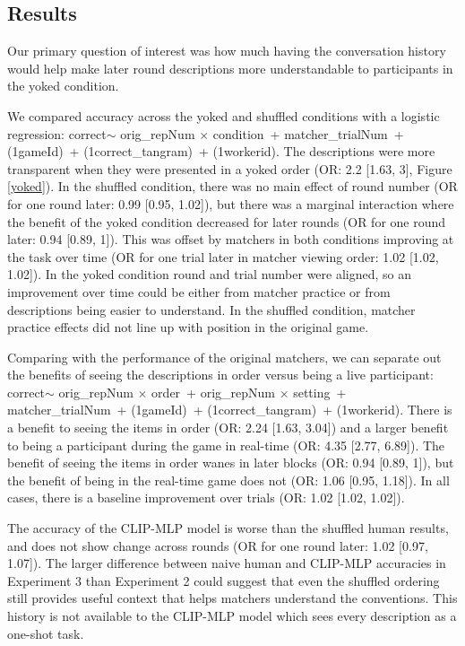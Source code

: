 \documentclass[10pt, letterpaper]{article}
\begin{document}
\subsection{Results}\label{results-2}

Our primary question of interest was how much having the conversation
history would help make later round descriptions more understandable to
participants in the yoked condition.

We compared accuracy across the yoked and shuffled conditions with a
logistic regression: correct\(\sim\) orig\_repNum \(\times\) condition~+
matcher\_trialNum~+ (1\textbar gameId)~+ (1\textbar correct\_tangram)~+
(1\textbar workerid). The descriptions were more transparent when they
were presented in a yoked order (OR: 2.2 {[}1.63, 3{]}, Figure
\ref{yoked}). In the shuffled condition, there was no main effect of
round number (OR for one round later: 0.99 {[}0.95, 1.02{]}), but there
was a marginal interaction where the benefit of the yoked condition
decreased for later rounds (OR for one round later: 0.94 {[}0.89, 1{]}).
This was offset by matchers in both conditions improving at the task
over time (OR for one trial later in matcher viewing order: 1.02
{[}1.02, 1.02{]}). In the yoked condition round and trial number were
aligned, so an improvement over time could be either from matcher
practice or from descriptions being easier to understand. In the
shuffled condition, matcher practice effects did not line up with
position in the original game.

Comparing with the performance of the original matchers, we can separate
out the benefits of seeing the descriptions in order versus being a live
participant: correct\(\sim\) orig\_repNum \(\times\) order~+
orig\_repNum \(\times\) setting~+ matcher\_trialNum~+
(1\textbar gameId)~+ (1\textbar correct\_tangram)~+
(1\textbar workerid). There is a benefit to seeing the items in order
(OR: 2.24 {[}1.63, 3.04{]}) and a larger benefit to being a participant
during the game in real-time (OR: 4.35 {[}2.77, 6.89{]}). The benefit of
seeing the items in order wanes in later blocks (OR: 0.94 {[}0.89,
1{]}), but the benefit of being in the real-time game does not (OR: 1.06
{[}0.95, 1.18{]}). In all cases, there is a baseline improvement over
trials (OR: 1.02 {[}1.02, 1.02{]}).

The accuracy of the CLIP-MLP model is worse than the shuffled human
results, and does not show change across rounds (OR for one round later:
1.02 {[}0.97, 1.07{]}). The larger difference between naive human and
CLIP-MLP accuracies in Experiment 3 than Experiment 2 could suggest that
even the shuffled ordering still provides useful context that helps
matchers understand the conventions. This history is not available to
the CLIP-MLP model which sees every description as a one-shot task.
\end{document}
